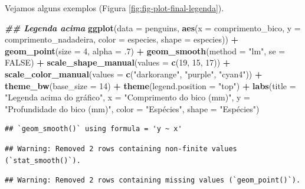 \documentclass[
]{article}
\newenvironment{Shaded}{\begin{snugshade}}{\end{snugshade}}
\newcommand{\AttributeTok}[1]{\textcolor[rgb]{0.13,0.29,0.53}{#1}}
\newcommand{\ConstantTok}[1]{\textcolor[rgb]{0.56,0.35,0.01}{#1}}
\newcommand{\DecValTok}[1]{\textcolor[rgb]{0.00,0.00,0.81}{#1}}
\newcommand{\DocumentationTok}[1]{\textcolor[rgb]{0.56,0.35,0.01}{\textbf{\textit{#1}}}}
\newcommand{\FunctionTok}[1]{\textcolor[rgb]{0.13,0.29,0.53}{\textbf{#1}}}
\newcommand{\NormalTok}[1]{#1}
\newcommand{\SpecialCharTok}[1]{\textcolor[rgb]{0.81,0.36,0.00}{\textbf{#1}}}
\newcommand{\StringTok}[1]{\textcolor[rgb]{0.31,0.60,0.02}{#1}}
\begin{document}
Vejamos alguns exemplos (Figura \ref{fig:fig-plot-final-legenda}).

\begin{Shaded}
\begin{Highlighting}[]
\DocumentationTok{\#\# Legenda acima}
\FunctionTok{ggplot}\NormalTok{(}\AttributeTok{data =}\NormalTok{ penguins, }
       \FunctionTok{aes}\NormalTok{(}\AttributeTok{x =}\NormalTok{ comprimento\_bico, }\AttributeTok{y =}\NormalTok{ comprimento\_nadadeira,}
           \AttributeTok{color =}\NormalTok{ especies, }\AttributeTok{shape =}\NormalTok{ especies)) }\SpecialCharTok{+}
    \FunctionTok{geom\_point}\NormalTok{(}\AttributeTok{size =} \DecValTok{4}\NormalTok{, }\AttributeTok{alpha =}\NormalTok{ .}\DecValTok{7}\NormalTok{) }\SpecialCharTok{+}
    \FunctionTok{geom\_smooth}\NormalTok{(}\AttributeTok{method =} \StringTok{"lm"}\NormalTok{, }\AttributeTok{se =} \ConstantTok{FALSE}\NormalTok{) }\SpecialCharTok{+}
    \FunctionTok{scale\_shape\_manual}\NormalTok{(}\AttributeTok{values =} \FunctionTok{c}\NormalTok{(}\DecValTok{19}\NormalTok{, }\DecValTok{15}\NormalTok{, }\DecValTok{17}\NormalTok{)) }\SpecialCharTok{+}
    \FunctionTok{scale\_color\_manual}\NormalTok{(}\AttributeTok{values =} \FunctionTok{c}\NormalTok{(}\StringTok{"darkorange"}\NormalTok{, }\StringTok{"purple"}\NormalTok{, }\StringTok{"cyan4"}\NormalTok{)) }\SpecialCharTok{+}
    \FunctionTok{theme\_bw}\NormalTok{(}\AttributeTok{base\_size =} \DecValTok{14}\NormalTok{) }\SpecialCharTok{+}
    \FunctionTok{theme}\NormalTok{(}\AttributeTok{legend.position =} \StringTok{"top"}\NormalTok{) }\SpecialCharTok{+}
    \FunctionTok{labs}\NormalTok{(}\AttributeTok{title =} \StringTok{"Legenda acima do gráfico"}\NormalTok{, }\AttributeTok{x =} \StringTok{"Comprimento do bico (mm)"}\NormalTok{, }
         \AttributeTok{y =} \StringTok{"Profundidade do bico (mm)"}\NormalTok{, }\AttributeTok{color =} \StringTok{"Espécies"}\NormalTok{, }\AttributeTok{shape =} \StringTok{"Espécies"}\NormalTok{)}
\end{Highlighting}
\end{Shaded}

\begin{verbatim}
## `geom_smooth()` using formula = 'y ~ x'
\end{verbatim}

\begin{verbatim}
## Warning: Removed 2 rows containing non-finite values (`stat_smooth()`).
\end{verbatim}

\begin{verbatim}
## Warning: Removed 2 rows containing missing values (`geom_point()`).
\end{verbatim}
\end{document}

